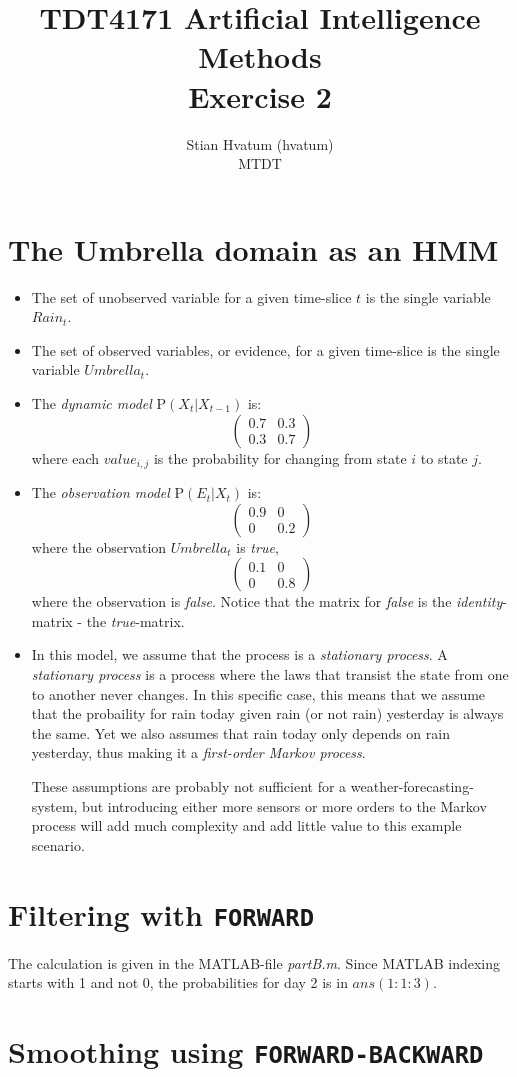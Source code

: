 \documentclass[english]{article}
\title{TDT4171 Artificial Intelligence Methods\\
\Huge Exercise 2}
\author{Stian Hvatum (hvatum)\\MTDT}
\begin{document}
\maketitle
{}
\section{The Umbrella domain as an HMM}
\begin{itemize}
  \item The set of unobserved variable for a given time-slice \(t\) is the
  single variable \(Rain_t\).
  \item The set of observed variables, or evidence, for a given time-slice is
  the single variable \(Umbrella_t\).
  \item The \emph{dynamic model} P\((X_t|X_{t-1})\) is:
\[ \left(
   \begin{array}{cc}
    0.7 & 0.3 \\
	0.3 & 0.7
	\end{array}
\right)\] 
where each \(value_{i,j}\) is the probability for changing from state \(i\) to
state \(j\).
  \item The \emph{observation model} P\((E_t|X_t)\) is:
\[ \left(
   \begin{array}{cc}
    0.9 & 0 \\
	0 & 0.2
	\end{array}
\right)\]
where the observation \(Umbrella_t\) is \emph{true},  
\[ \left(
   \begin{array}{cc}
    0.1 & 0 \\
	0 & 0.8
	\end{array}
\right)\] 
where the observation is \emph{false}. Notice that the matrix for \emph{false}
is the \emph{identity}-matrix - the \emph{true}-matrix.

\item In this model, we assume that the process is a \emph{stationary process}.
A \emph{stationary process} is a process where the laws that transist the state
from one to another never changes. In this specific case, this means that we
assume that the probaility for rain today given rain (or not rain) yesterday is
always the same. Yet we also assumes that rain today only depends on rain
yesterday, thus making it a \emph{first-order Markov process}.

These assumptions are probably not sufficient for a weather-forecasting-system,
but introducing either more sensors or more orders to the Markov process will
add much complexity and add little value to this example scenario.
\end{itemize}

\section{Filtering with \texttt{FORWARD}}
The calculation is given in the MATLAB-file \emph{partB.m}. Since MATLAB
indexing starts with 1 and not 0, the probabilities for day 2 is in
\(ans(1:1:3)\).

\section{Smoothing using \texttt{FORWARD-BACKWARD}}
\end{document}
